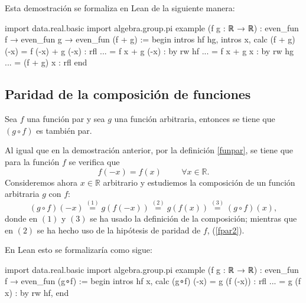 Esta demostración se formaliza en Lean de la siguiente manera:
\begin{leancode}
import data.real.basic
import algebra.group.pi
example (f g : ℝ → ℝ) : even_fun f → even_fun g →  even_fun (f + g) :=
begin
intros hf hg,
intros x,
calc (f + g) (-x) = f (-x) + g (-x) : rfl
... = f x + g (-x) : by rw hf 
... = f x + g x : by rw hg 
... = (f + g) x : rfl
end
\end{leancode}

\subsection{Paridad de la composición de funciones}
\begin{teorema}
	Sea \(f\) una función par y sea \(g\) una función arbitraria, entonces se tiene que \((g\circ f)\) es también par.
\end{teorema}
\begin{demostracion}
	Al igual que en la demostración anterior, por la definición \ref{funpar}, se tiene que para la función \(f\) se verifica que
	\begin{equation}\label{fpar2}
	f(-x)=f(x) \hspace{1cm}\forall x \in \mathbb{R}.
	\end{equation}
	Consideremos ahora \(x\in \mathbb{R}\) arbitrario y estudiemos la composición de un función arbitraria \(g\) con \(f\):
	\begin{equation*}
	(g\circ f)(-x)\stackrel{(1)}{=} g(f(-x))\stackrel{(2)}{=}g(f(x)) \stackrel{(3)}{=} (g\circ f)(x),
	\end{equation*}
	donde en \((1)\) y \((3)\) se ha usado la definición de la composición; mientras que en \((2)\) se ha hecho uso de la hipótesis de paridad de \(f\), (\ref{fpar2}).
\end{demostracion}

En Lean esto se formalizaría como sigue:
\begin{leancode}
import data.real.basic
import algebra.group.pi
example (f g : ℝ → ℝ) : even_fun f → even_fun (g∘f) :=
begin
intros hf x,
calc (g∘f) (-x) = g (f (-x)) : rfl
... = g (f x) : by rw hf,
end
\end{leancode}

